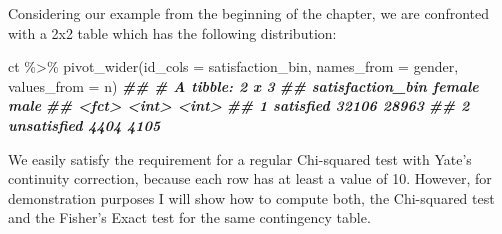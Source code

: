 \documentclass[
]{book}
\newenvironment{Shaded}{\begin{snugshade}}{\end{snugshade}}
\newcommand{\AttributeTok}[1]{\textcolor[rgb]{0.77,0.63,0.00}{#1}}
\newcommand{\DocumentationTok}[1]{\textcolor[rgb]{0.56,0.35,0.01}{\textbf{\textit{#1}}}}
\newcommand{\FunctionTok}[1]{\textcolor[rgb]{0.00,0.00,0.00}{#1}}
\newcommand{\NormalTok}[1]{#1}
\newcommand{\SpecialCharTok}[1]{\textcolor[rgb]{0.00,0.00,0.00}{#1}}
\begin{document}
Considering our example from the beginning of the chapter, we are confronted with a 2x2 table which has the following distribution:

\begin{Shaded}
\begin{Highlighting}[]
\NormalTok{ct }\SpecialCharTok{\%\textgreater{}\%} \FunctionTok{pivot\_wider}\NormalTok{(}\AttributeTok{id\_cols =}\NormalTok{ satisfaction\_bin,}
                   \AttributeTok{names\_from =}\NormalTok{ gender,}
                   \AttributeTok{values\_from =}\NormalTok{ n)}
\DocumentationTok{\#\# \# A tibble: 2 x 3}
\DocumentationTok{\#\#   satisfaction\_bin female  male}
\DocumentationTok{\#\#   \textless{}fct\textgreater{}             \textless{}int\textgreater{} \textless{}int\textgreater{}}
\DocumentationTok{\#\# 1 satisfied         32106 28963}
\DocumentationTok{\#\# 2 unsatisfied        4404  4105}
\end{Highlighting}
\end{Shaded}

We easily satisfy the requirement for a regular Chi-squared test with Yate's continuity correction, because each row has at least a value of 10. However, for demonstration purposes I will show how to compute both, the Chi-squared test and the Fisher's Exact test for the same contingency table.
\end{document}
